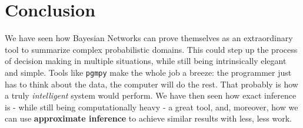 \section{Conclusion}
\label{sec:conclusion}
We have seen how Bayesian Networks can prove themselves as an extraordinary tool to summarize complex probabilistic domains. This could step up the process of decision making in multiple situations, while still being intrinsically elegant and simple. Tools like \texttt{pgmpy} make the whole job a breeze: the programmer just has to think about the data, the computer will do the rest. That probably is how a truly \textit{intelligent} system would perform. We have then seen how exact inference is - while still being computationally heavy - a great tool, and, moreover, how we can use \textbf{approximate inference} to achieve similar results with less, less work. 